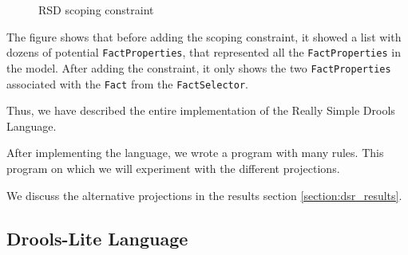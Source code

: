 \begin{figure}
    \centering
    \caption{RSD scoping constraint}
    \label{fig:RSDConstraint}
\end{figure}

The figure shows that before adding the scoping constraint, it showed a list with dozens of potential \texttt{FactProperties}, that represented all the \texttt{FactProperties} in the model.
After adding the constraint, it only shows the two \texttt{FactProperties} associated with the \texttt{Fact} from the \texttt{FactSelector}.

Thus, we have described the entire implementation of the Really Simple Drools Language.

After implementing the language, we wrote a program with many rules.
This program on which we will experiment with the different projections.

We discuss the alternative projections in the results section \ref{section:dsr_results}.

\newpage
\subsection{Drools-Lite Language}
\label{section:DroolsLite}

